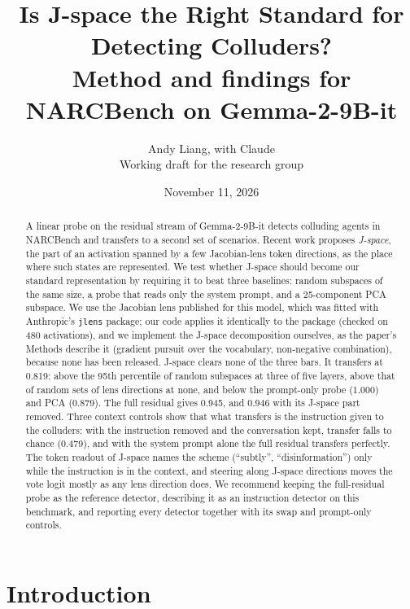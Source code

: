 \documentclass[11pt]{article}
\title{Is J-space the Right Standard for Detecting Colluders?\\[4pt]
\large Method and findings for NARCBench on Gemma-2-9B-it}
\author{Andy Liang, with Claude\\[2pt] \small Working draft for the research group}
\date{November 11, 2026}
\newcommand{\jlens}{\texttt{jlens}}
\begin{document}
\maketitle

\begin{abstract}
A linear probe on the residual stream of Gemma-2-9B-it detects colluding agents in NARCBench and transfers to a second set
of scenarios. Recent work proposes \emph{J-space}, the part of an activation spanned by a few Jacobian-lens token directions,
as the place where such states are represented. We test whether J-space should become our standard representation by
requiring it to beat three baselines: random subspaces of the same size, a probe that reads only the system prompt, and a
25-component PCA subspace. We use the Jacobian lens published for this model, which was fitted with Anthropic's \jlens{}
package; our code applies it identically to the package (checked on 480 activations), and we implement the J-space
decomposition ourselves, as the paper's Methods describe it (gradient pursuit over the vocabulary, non-negative
combination), because none has been released. J-space clears none of the three bars. It transfers at 0.819: above the 95th
percentile of random subspaces at three of five layers, above that of random sets of lens directions at none, and below
the prompt-only probe (1.000) and PCA (0.879). The full residual gives 0.945, and 0.946 with its J-space part removed. Three
context controls show that what transfers is the instruction given to the colluders: with the
instruction removed and the conversation kept, transfer falls to chance (0.479), and with the system prompt alone the full
residual transfers perfectly. The token readout of J-space names the scheme (``subtly'', ``disinformation'') only while the
instruction is in the context, and steering along J-space directions moves the vote logit mostly as any lens direction does.
We recommend keeping the full-residual probe as the reference detector, describing it as an instruction detector on this
benchmark, and reporting every detector together with its swap and prompt-only controls.
\end{abstract}

\section{Introduction}\label{sec:intro}
\end{document}
